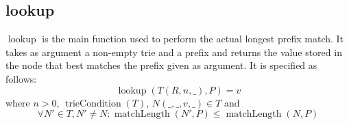 \documentclass{article}
\DeclareMathOperator{\matchlength}{matchLength}
\DeclareMathOperator{\triecond}{trieCondition}
\DeclareMathOperator{\lookup}{lookup}
\begin{document}
\subsection{lookup}
$\lookup$ is the main function used to perform the actual longest prefix match.
It takes as argument a non-empty trie and a prefix and returns the value stored
in the node that best matches the prefix given as argument. It is specified as
follows:
\[
    \lookup(T(R, n, \_), P) = v
\]
where $n > 0$, $\triecond(T)$, $N(\_, \_, v, \_) \in T$ and
\[
    \forall N'\in T, N' \neq N: \matchlength(N', P) \leq \matchlength(N, P)
\]
\end{document}
